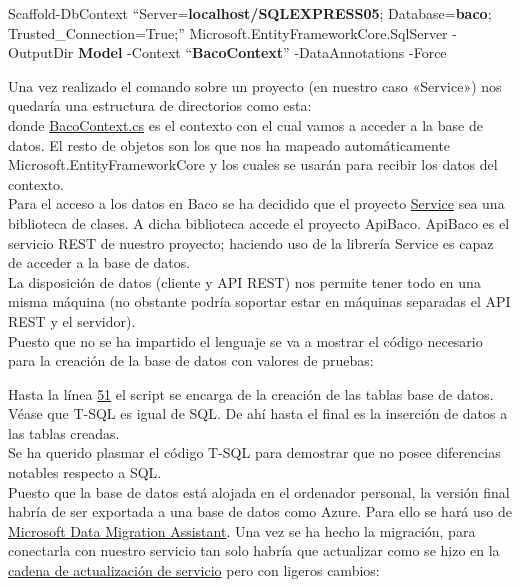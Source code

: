 \documentclass[12pt, a4paper]{book} %
\begin{document}
			\begin{center}
				\hypertarget{updatestring}{\textsf{Scaffold-DbContext ``Server=\textbf{localhost\slash SQLEXPRESS05}; Database=\textbf{baco}; Trusted\_Connection=True;'' Microsoft.EntityFrameworkCore.SqlServer -OutputDir \textbf{Model} -Context ``\textbf{BacoContext}'' -DataAnnotations -Force}}
			\end{center}
			Una vez realizado el comando sobre un proyecto (en nuestro caso «Service») nos quedaría una estructura de directorios como esta:\\
			\hypertarget{servicetree}{}
			donde \hyperlink{bacocontext}{BacoContext.cs} es el contexto con el cual vamos a acceder a la base de datos. El resto de objetos son los que nos ha mapeado automáticamente Microsoft.EntityFrameworkCore y los cuales se usarán para recibir los datos del contexto.\\
			Para el acceso a los datos en Baco se ha decidido que el proyecto \hyperlink{servicetree}{Service} sea una biblioteca de clases. A dicha biblioteca accede el proyecto ApiBaco. ApiBaco es el servicio REST de nuestro proyecto; haciendo uso de la librería Service es capaz de acceder a la base de datos.\\
			La disposición de datos (cliente y API REST) nos permite tener todo en una misma máquina (no obstante podría soportar estar en máquinas separadas el API REST y el servidor).\\
			Puesto que no se ha impartido el lenguaje se va a mostrar el código necesario para la creación de la base de datos con valores de pruebas:
			
			Hasta la línea \hyperlink{src/baco.sql51}{51} el script se encarga de la creación de las tablas base de datos. Véase que T-SQL es igual de SQL. De ahí hasta el final es la inserción de datos a las tablas creadas.\\
			Se ha querido plasmar el código T-SQL para demostrar que no posee diferencias notables respecto a SQL.\\
			Puesto que la base de datos está alojada en el ordenador personal, la versión final habría de ser exportada a una base de datos como Azure. Para ello se hará uso de \href{https://www.microsoft.com/en-us/download/confirmation.aspx?id=53595}{Microsoft Data Migration Assistant}. Una vez se ha hecho la migración, para conectarla con nuestro servicio tan solo habría que actualizar como se hizo en la \hyperlink{updatestring}{cadena de actualización de servicio} pero con ligeros cambios:
\end{document}
